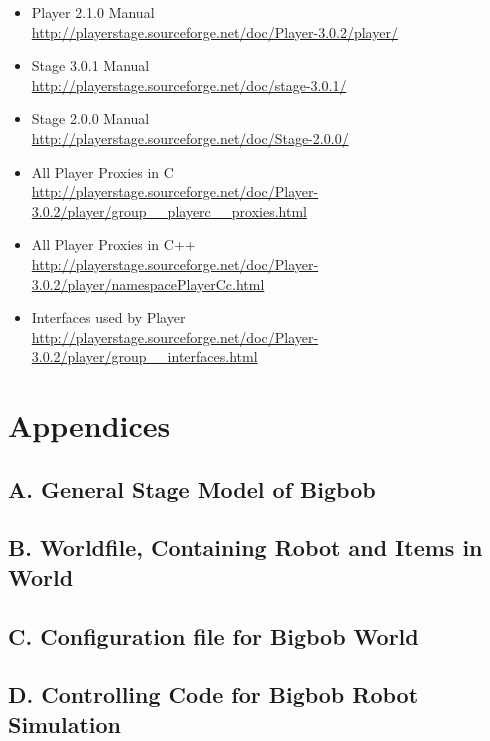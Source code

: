 \documentclass[a4paper]{report}
\begin{document}
\begin{itemize}

\item Player 2.1.0 Manual \\
\url{http://playerstage.sourceforge.net/doc/Player-3.0.2/player/}

\item Stage 3.0.1 Manual \\
\url{http://playerstage.sourceforge.net/doc/stage-3.0.1/}

\item Stage 2.0.0 Manual\\
\url{http://playerstage.sourceforge.net/doc/Stage-2.0.0/}

\item All Player Proxies in C\\
\url{http://playerstage.sourceforge.net/doc/Player-3.0.2/player/group__playerc__proxies.html}

\item All Player Proxies in C++\\
\url{http://playerstage.sourceforge.net/doc/Player-3.0.2/player/namespacePlayerCc.html}

\item Interfaces used by Player\\
\url{http://playerstage.sourceforge.net/doc/Player-3.0.2/player/group__interfaces.html}
\end{itemize}



 



\chapter{Appendices}

\section{A. General Stage Model of Bigbob}\label{app:Abigbob.inc}


\section{B. Worldfile, Containing Robot and Items in World}\label{app:Brobotsjunkworld}


\section{C. Configuration file for Bigbob World}\label{app:Cconfig}


\section{D. Controlling Code for Bigbob Robot Simulation}\label{app:Dbigbobcode}

\end{document}
